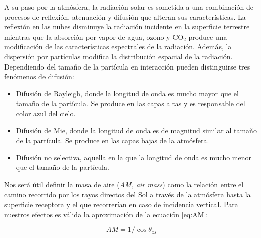 A su paso por la atmósfera, la radiación solar es sometida a una
combinación de procesos de reflexión, atenuación y difusión que
alteran sus características.  La reflexión en las nubes disminuye la
radiación incidente en la superficie terrestre mientras que la
absorción por vapor de agua, ozono y $\mathrm{CO}_2$ produce una
modificación de las características espectrales de la
radiación. Además, la dispersión por partículas modifica la
distribución espacial de la radiación. Dependiendo del tamaño de la
partícula en interacción pueden distinguirse tres fenómenos de
difusión:
\begin{itemize}
\item Difusión de Rayleigh, donde la longitud de onda es mucho mayor
  que el tamaño de la partícula. Se produce en las capas altas y es responsable
del color azul del cielo.
\item Difusión de Mie, donde la longitud de onda es de magnitud similar al tamaño
de la partícula. Se produce en las capas bajas de la atmósfera.
\item Difusión no selectiva, aquella en la que la longitud de onda es mucho
menor que el tamaño de la partícula.
\end{itemize}
Nos será útil definir la masa de aire (\emph{AM, air mass}) como la
relación entre el camino recorrido por los rayos directos del Sol
a través de la atmósfera hasta la superficie receptora y el que recorrerían
en caso de incidencia vertical. Para nuestros efectos es válida la
aproximación de la ecuación \ref{eq:AM}:

\begin{equation}
AM=1/\cos\theta_{zs}\label{eq:AM}\end{equation}

